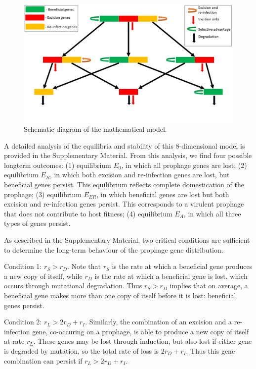 \begin{figure}[H]
 \centering
\includegraphics[width=15cm]{Model}
\caption{Schematic diagram of the mathematical model.}
\label{fig:schematic}
\end{figure}

A detailed analysis of the equilibria and stability of this 8-dimensional model is provided in the Supplementary Material. From this analysis, we find four possible longterm outcomes: (1) equilibrium $E_0$, in which all prophage genes are lost; (2) equilibrium $E_B$, in which both excision and re-infection genes are lost, but beneficial genes persist.  This equilibrium reflects complete domestication of the prophage; (3) equilibrium $E_{ER}$, in which beneficial genes are lost but both excision and re-infection genes persist. This corresponds to a virulent prophage that does not contribute to host fitness; (4) equilibrium $E_A$, in which all three types of genes persist.

As described in the Supplementary Material, two critical conditions are sufficient to determine the long-term behaviour of the prophage gene distribution.

Condition 1: $r_S> r_D$. Note that $r_S$ is the rate at which a beneficial gene produces a new copy of itself, while $r_D$ is the rate at which a beneficial gene is lost, which occurs through mutational degradation.  Thus $r_S>r_D$ implies that on average, a beneficial gene makes more than one copy of itself before it is lost: beneficial genes persist.

Condition 2: $r_L> 2r_D + r_I$.  Similarly, the combination of an excision and a re-infection gene, co-occuring on a prophage, is able to produce a new copy of itself at rate $r_L$. These genes may be lost through induction, but also lost if either gene is degraded by mutation, so the total rate of loss is $2r_D + r_I$.  Thus this gene combination can persist if $r_L>2r_D + r_I$.

